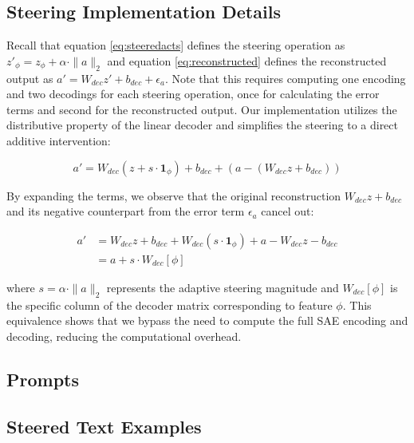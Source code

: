 \documentclass{article}
\theoremstyle{plain}
\theoremstyle{definition}
\theoremstyle{remark}
\begin{document}
\subsection{Steering Implementation Details}

Recall that equation \ref{eq:steeredacts} defines the steering operation as $z'_{\phi} = z_{\phi} + \alpha \cdot \|a\|_2$ and equation \ref{eq:reconstructed} defines the reconstructed output as $a' = W_{dec}z' + b_{dec} + \epsilon_a$.
Note that this requires computing one encoding and two decodings for each steering operation, once for calculating the error terms and second for the reconstructed output. Our implementation utilizes the distributive property of the linear decoder and simplifies the steering to a direct additive intervention:

\begin{equation}
    a' = W_{dec}(z + s \cdot \mathbf{1}_\phi) + b_{dec} + (a - (W_{dec}z + b_{dec}))
\end{equation}

By expanding the terms, we observe that the original reconstruction $W_{dec}z + b_{dec}$ and its negative counterpart from the error term $\epsilon_a$ cancel out:

\begin{align*}
    a' &= W_{dec}z + b_{dec} + W_{dec}(s \cdot \mathbf{1}_\phi) + a - W_{dec}z - b_{dec} \\
    &= a + s \cdot W_{dec}[\phi]
\end{align*}

where $s = \alpha \cdot \|a\|_2$ represents the adaptive steering magnitude and $W_{dec}[\phi]$ is the specific column of the decoder matrix corresponding to feature $\phi$. This equivalence shows that we bypass the need to compute the full SAE encoding and decoding, reducing the computational overhead.

\newpage
\subsection{Prompts}
\label{sec:steeringprompts}





\newpage
\subsection{Steered Text Examples}


\end{document}
